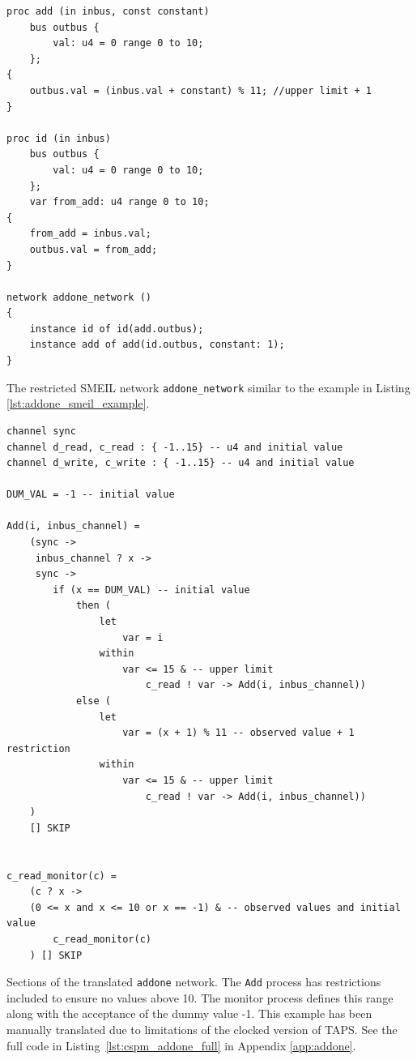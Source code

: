 \begin{listing}
\begin{verbatim}
proc add (in inbus, const constant)
    bus outbus {
        val: u4 = 0 range 0 to 10;
    };
{
    outbus.val = (inbus.val + constant) % 11; //upper limit + 1
}

proc id (in inbus)
    bus outbus {
        val: u4 = 0 range 0 to 10;
    };
    var from_add: u4 range 0 to 10;
{
    from_add = inbus.val;
    outbus.val = from_add;
}

network addone_network ()
{
    instance id of id(add.outbus);
    instance add of add(id.outbus, constant: 1);
}
\end{verbatim}
\caption{The restricted SMEIL network \texttt{addone\_network} similar to the example in Listing \ref{lst:addone_smeil_example}.}
\label{lst:addone_mod_example}
\end{listing}
\begin{listing}
\begin{verbatim}
channel sync
channel d_read, c_read : { -1..15} -- u4 and initial value
channel d_write, c_write : { -1..15} -- u4 and initial value

DUM_VAL = -1 -- initial value

Add(i, inbus_channel) =
    (sync ->
     inbus_channel ? x ->
     sync ->
        if (x == DUM_VAL) -- initial value
            then (
                let
                    var = i
                within
                    var <= 15 & -- upper limit
                        c_read ! var -> Add(i, inbus_channel))
            else (
                let
                    var = (x + 1) % 11 -- observed value + 1 restriction
                within
                    var <= 15 & -- upper limit
                        c_read ! var -> Add(i, inbus_channel))
    )
    [] SKIP


c_read_monitor(c) =
    (c ? x ->
    (0 <= x and x <= 10 or x == -1) & -- observed values and initial value
        c_read_monitor(c)
    ) [] SKIP

\end{verbatim}
\caption{Sections of the translated \texttt{addone} network. The \texttt{Add} process has restrictions included to ensure no values above 10. The monitor process defines this range along with the acceptance of the dummy value -1. This example has been manually translated due to limitations of the clocked version of TAPS. See the full code in Listing~\ref{lst:cspm_addone_full} in Appendix \ref{app:addone}.}
\label{lst:cspm_addone_restricted}
\end{listing}

